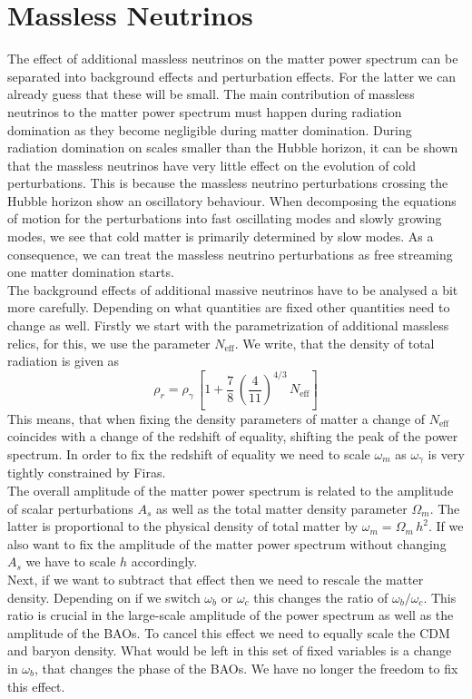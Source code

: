 \documentclass[../main.tex]{subfiles}
\begin{document}
\section{Massless Neutrinos}
The effect of additional massless neutrinos on the matter power spectrum can be separated into background effects and perturbation effects. For the latter we can already guess that these will be small. The main contribution of massless neutrinos to the matter power spectrum must happen during radiation domination as they become negligible during matter domination. During radiation domination on scales smaller than the Hubble horizon, it can be shown that the massless neutrinos have very little effect on the evolution of cold perturbations. This is because the massless neutrino perturbations crossing the Hubble horizon show an oscillatory behaviour. When decomposing the equations of motion for the perturbations into fast oscillating modes and slowly growing modes, we see that cold matter is primarily determined by slow modes. As a consequence, we can treat the massless neutrino perturbations as free streaming one matter domination starts.\\
The background effects of additional massive neutrinos have to be analysed a bit more carefully. Depending on what quantities are fixed other quantities need to change as well. Firstly we start with the parametrization of additional massless relics, for this, we use the parameter $N_\mathrm{eff}$. We write, that the density of total radiation is given as 
\begin{equation}
    \rho_r = \rho_\gamma\,\left[1+\frac{7}{8}\,\left(\frac{4}{11}\right)^{4/3}\,N_\mathrm{eff} \right]
\end{equation}
This means, that when fixing the density parameters of matter a change of $N_\mathrm{eff}$ coincides with a change of the redshift of equality, shifting the peak of the power spectrum. In order to fix the redshift of equality we need to scale $\omega_m$ as $\omega_\gamma$ is very tightly constrained by Firas.\\
The overall amplitude of the matter power spectrum is related to the amplitude of scalar perturbations $A_s$ as well as the total matter density parameter $\Omega_m$. The latter is proportional to the physical density of total matter by $\omega_m=\Omega_m\,h^2$. If we also want to fix the amplitude of the matter power spectrum without changing $A_s$ we have to scale $h$ accordingly.\\
Next, if we want to subtract that effect then we need to rescale the matter density. Depending on if we switch $\omega_b$ or $\omega_c$ this changes the ratio of $\omega_b/\omega_c$. This ratio is crucial in the large-scale amplitude of the power spectrum as well as the amplitude of the BAOs. To cancel this effect we need to equally scale the CDM and baryon density. What would be left in this set of fixed variables is a change in $\omega_b$, that changes the phase of the BAOs. We have no longer the freedom to fix this effect.\\
\end{document}
